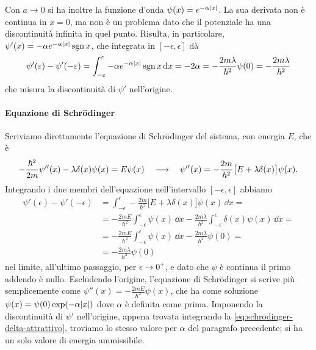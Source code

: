 Con $a\to 0$ si ha inoltre la funzione d'onda $\psi(x)=e^{-\alpha\lvert x\rvert}$.
La sua derivata non è continua in $x=0$, ma non è un problema dato che il potenziale ha una discontinuità infinita in quel punto.
Risulta, in particolare, $\psi'(x)=-\alpha e^{-\alpha\lvert x\rvert}\operatorname{sgn} x$, che integrata in $[-\epsilon,\epsilon]$ dà
\begin{equation}
	\psi'(\varepsilon)-\psi'(-\varepsilon)=\int_{-\varepsilon}^{\varepsilon}-\alpha e^{-\alpha\lvert x\rvert}\operatorname{sgn} x\,\textup{d} x=-2\alpha=-\frac{2m\lambda}{\hbar^2}\psi(0)=-\frac{2m\lambda}{\hbar^2}
	\label{eq:discontinuita-derivata-wf-delta-attrattivo}
\end{equation}
che misura la discontinuità di $\psi'$ nell'origine.

\paragraph{Equazione di Schr\"odinger}
Scriviamo direttamente l'equazione di Schr\"odinger del sistema, con energia $E$, che è
\begin{equation}
	-\frac{\hbar^2}{2m}\psi''(x)-\lambda\delta(x)\psi(x)=E\psi(x)\quad\longrightarrow\quad \psi''(x)=-\frac{2m}{\hbar^2}\big[E+\lambda\delta(x)\big]\psi(x).
	\label{eq:schrodinger-delta-attrattivo}
\end{equation}
Integrando i due membri dell'equazione nell'intervallo $[-\epsilon,\epsilon]$ abbiamo
\begin{equation}
	\begin{split}
		\psi'(\epsilon)-\psi'(-\epsilon)&=\int_{-\epsilon}^{\epsilon}-\frac{2m}{\hbar^2}\big[E+\lambda\delta(x)\big]\psi(x)\,\dd x=\\
		&=-\frac{2mE}{\hbar^2}\int_{-\epsilon}^{\epsilon}\psi(x)\,\dd x-\frac{2m\lambda}{\hbar^2}\int_{-\epsilon}^{\epsilon}\delta(x)\psi(x)\,\dd x=\\
		&=-\frac{2mE}{\hbar^2}\int_{-\epsilon}^{\epsilon}\psi(x)\,\dd x-\frac{2m\lambda}{\hbar^2}\psi(0)=\\
		&=-\frac{2m\lambda}{\hbar^2}\psi(0)
	\end{split}
\end{equation}
nel limite, all'ultimo passaggio, per $\epsilon\to 0^+$, e dato che $\psi$ è continua il primo addendo è nullo.
Escludendo l'origine, l'equazione di Schr\"odinger si scrive più semplicemente come $\psi''(x)=-\frac{2mE}{\hbar^2}\psi(x)$, che ha come soluzione $\psi(x)=\psi(0)\exp(-\alpha\lvert x\rvert)$ dove $\alpha$ è definita come prima.
Imponendo la discontinuità di $\psi'$ nell'origine, appena trovata integrando la \eqref{eq:schrodinger-delta-attrattivo}, troviamo lo stesso valore per $\alpha$ del paragrafo precedente; si ha un solo valore di energia ammissibile.

